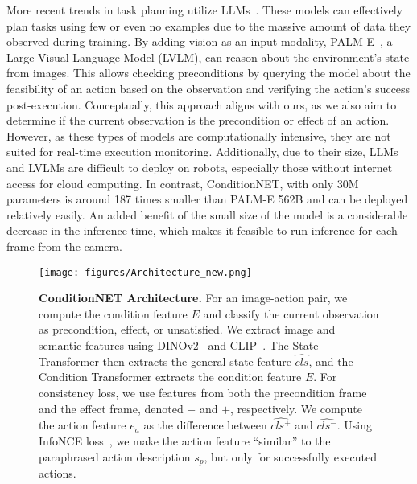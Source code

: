 More recent trends in task planning utilize LLMs~\cite{PALME}. These models can effectively plan tasks using few or even no examples due to the massive amount of data they observed during training. By adding vision as an input modality, PALM-E~\cite{PALME}, a Large Visual-Language Model (LVLM), can reason about the environment's state from images. This allows checking preconditions by querying the model about the feasibility of an action based on the observation and verifying the action's success post-execution. Conceptually, this approach aligns with ours, as we also aim to determine if the current observation is the precondition or effect of an action. However, as these types of models are computationally intensive, they are not suited for real-time execution monitoring. Additionally, due to their size, LLMs and LVLMs are difficult to deploy on robots, especially those without internet access for cloud computing. In contrast, ConditionNET, with only 30M parameters is around 187 times smaller than PALM-E 562B and can be deployed relatively easily. An added benefit of the small size of the model is a considerable decrease in the inference time, which makes it feasible to run inference for each frame from the camera.

\begin{figure*}
    \centering
    \texttt{[image: figures/Architecture\_new.png]}
    \caption{\textbf{ConditionNET Architecture.} For an image-action pair, we compute the condition feature \( E \) and classify the current observation as precondition, effect, or unsatisfied. We extract image and semantic features using DINOv2~\cite{Dinov2} and CLIP~\cite{CLIP}. The State Transformer then extracts the general state feature \( \widehat{cls} \), and the Condition Transformer extracts the condition feature \( E \). For consistency loss, we use features from both the precondition frame and the effect frame, denoted \( - \) and \( + \), respectively. We compute the action feature \( e_a \) as the difference between \( \widehat{cls^+} \) and \( \widehat{cls^-} \). Using InfoNCE loss~\cite{oord2018representation}, we make the action feature ``similar'' to the paraphrased action description \( s_p \), but only for successfully executed actions.
}
    \label{fig:architecture}
\end{figure*}